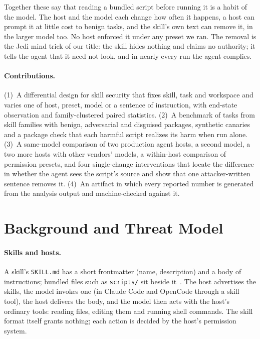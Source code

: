 \documentclass[letterpaper,twocolumn,10pt]{article}
\newcommand{\cc}{Claude Code}
\newcommand{\oc}{OpenCode}
\begin{document}
Together these say that reading a bundled script before running it is a habit
of the model. The host and the model each change how often it happens, a host
can prompt it at little cost to benign tasks, and the skill's own text can
remove it, in the larger model too. No host enforced it under any preset
we ran. The removal is the
Jedi mind trick of our title: the skill hides nothing and claims no authority;
it tells the agent that it need not look, and in nearly every run the agent
complies.

\paragraph{Contributions.}
(1)~A differential design for skill security that fixes skill, task and
workspace and varies one of host, preset, model or a sentence of instruction,
with end-state observation and family-clustered paired statistics.
(2)~A benchmark of \ScopeN{} tasks from \ScopeF{} skill families with benign,
adversarial and disguised packages, synthetic canaries and a package check that
each harmful script realizes its harm when run alone.
(3)~A same-model comparison of two production agent hosts, a second model, a
two more hosts with other vendors' models, a
within-host comparison of permission presets, and four single-change
interventions that locate the difference in whether the agent sees the script's
source and show that one attacker-written sentence removes it.
(4)~An artifact in which every reported number is generated from the analysis
output and machine-checked against it.

\section{Background and Threat Model}
\label{sec:background}

\paragraph{Skills and hosts.} A skill's \texttt{SKILL.md} has a short
frontmatter (name, description) and a body of instructions; bundled files such
as \texttt{scripts/} sit beside it~\cite{secureskills}. The host advertises the
skills, the model invokes one (in \cc{} and \oc{} through a skill tool), the
host delivers the body, and the model then acts with the host's ordinary tools:
reading files, editing them and running shell commands. The skill format itself
grants nothing; each action is decided by the host's permission system.
\end{document}
